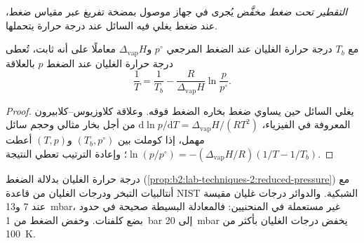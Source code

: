 \begin{definition}\label{def:b2:lab-techniques-2:reduced-pressure}
\emph{التقطير تحت ضغط مخفَّض} يُجرى
في جهاز موصول بمضخة تفريغ عبر مقياس ضغط، عند ضغط يغلي فيه السائل عند
درجة حرارة يتحملها.
\end{definition}

\begin{proposition}\label{prop:b2:lab-techniques-2:reduced-pressure}
مع $T_b$ درجة حرارة الغليان عند الضغط المرجعي $p^\circ$ و$\Delta_{\mathrm{vap}}H$
معاملًا على أنه ثابت، تُعطى درجة حرارة الغليان عند الضغط $p$ بالعلاقة
\begin{equation*}
\frac{1}{T} = \frac{1}{T_b} - \frac{R}{\Delta_{\mathrm{vap}}H}\ln\frac{p}{p^\circ}.
\end{equation*}
\end{proposition}

\begin{proof}
يغلي السائل حين يساوي ضغط بخاره الضغط فوقه. وعلاقة كلاوزيوس--كلابيرون
المعروفة في الفيزياء، $\mathrm d\ln p/\mathrm dT = \Delta_{\mathrm{vap}}H/(RT^2)$ من أجل بخار مثالي 
وحجم سائل مهمل، إذا كوملت بين $(T_b, p^\circ)$ و$(T, p)$ أعطت $\ln(p/p^\circ) =
-(\Delta_{\mathrm{vap}}H/R)(1/T - 1/T_b)$؛ وإعادة الترتيب تعطي النتيجة.
\end{proof}

\begin{omfigure}

{\small درجة حرارة الغليان بدلالة الضغط (\cref{prop:b2:lab-techniques-2:reduced-pressure}) مع
أنتالبيات التبخر ودرجات الغليان من قاعدة NIST الشبكية. والدوائر درجات غليان مقيسة
عند 7 و\qty{13}{mbar}، غير مستعملة في المنحنيين: فالمعادلة البسيطة صحيحة في حدود بضع كلفنات.
وخفض الضغط من \qty{1}{bar} إلى \qty{20}{mbar} يخفض درجات الغليان بأكثر من
\qty{100}{K}.}
\end{omfigure}

